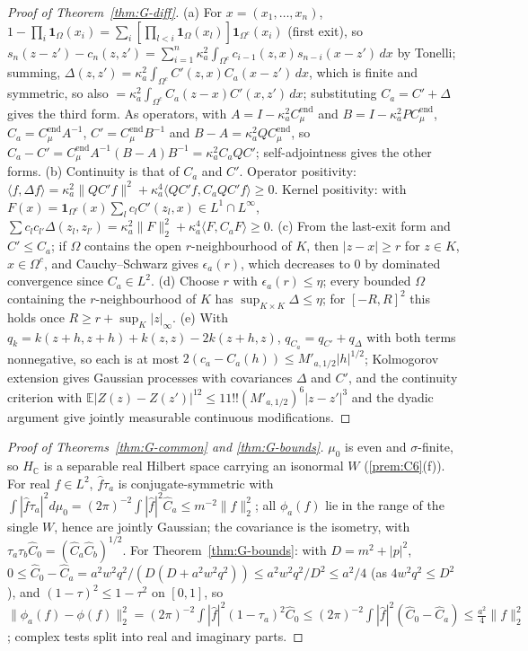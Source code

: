 \documentclass[11pt]{article}
\theoremstyle{plain}
\theoremstyle{definition}
\theoremstyle{remark}
\newcommand{\C}{\mathbb{C}}
\newcommand{\E}{\mathbb{E}}
\newcommand{\ind}{\mathbf{1}}
\newcommand{\Cend}{C^{\mathrm{end}}_{\mu}}
\begin{document}
\begin{proof}[Proof of Theorem~\ref{thm:G-diff}]
(a) For $x=(x_1,\dots,x_n)$, $1-\prod_i\ind_\Omega(x_i)=\sum_i[\prod_{l<i}\ind_\Omega(x_l)]\ind_{\Omega^{c}}(x_i)$ (first exit), so
$s_n(z-z')-c_n(z,z')=\sum_{i=1}^{n}\kappa_a^{2}\int_{\Omega^{c}}c_{i-1}(z,x)s_{n-i}(x-z')\,dx$ by Tonelli; summing,
$\Delta(z,z')=\kappa_a^{2}\int_{\Omega^{c}}C'(z,x)C_a(x-z')\,dx$, which is finite and symmetric, so also
$=\kappa_a^{2}\int_{\Omega^{c}}C_a(z-x)C'(x,z')\,dx$; substituting $C_a=C'+\Delta$ gives the third form. As
operators, with $A=I-\kappa_a^{2}\Cend$ and $B=I-\kappa_a^{2}P\Cend$, $C_a=\Cend A^{-1}$, $C'=\Cend B^{-1}$ and
$B-A=\kappa_a^{2}Q\Cend$, so $C_a-C'=\Cend A^{-1}(B-A)B^{-1}=\kappa_a^{2}C_aQC'$; self-adjointness gives the other
forms. (b) Continuity is that of $C_a$ and $C'$. Operator positivity:
$\langle f,\Delta f\rangle=\kappa_a^{2}\|QC'f\|^{2}+\kappa_a^{4}\langle QC'f,C_aQC'f\rangle\ge0$. Kernel positivity: with
$F(x)=\ind_{\Omega^{c}}(x)\sum_lc_lC'(z_l,x)\in L^{1}\cap L^{\infty}$,
$\sum c_lc_{l'}\Delta(z_l,z_{l'})=\kappa_a^{2}\|F\|_2^{2}+\kappa_a^{4}\langle F,C_aF\rangle\ge0$. (c) From the last-exit form and
$C'\le C_a$; if $\Omega$ contains the open $r$-neighbourhood of $K$, then $|z-x|\ge r$ for $z\in K$,
$x\in\Omega^{c}$, and Cauchy--Schwarz gives $\epsilon_a(r)$, which decreases to $0$ by dominated
convergence since $C_a\in L^{2}$. (d) Choose $r$ with $\epsilon_a(r)\le\eta$; every bounded $\Omega$
containing the $r$-neighbourhood of $K$ has $\sup_{K\times K}\Delta\le\eta$; for $[-R,R]^{2}$ this holds once
$R\ge r+\sup_K|z|_\infty$. (e) With $q_k=k(z+h,z+h)+k(z,z)-2k(z+h,z)$, $q_{C_a}=q_{C'}+q_\Delta$ with both
terms nonnegative, so each is at most $2(c_a-C_a(h))\le M'_{a,1/2}|h|^{1/2}$; Kolmogorov
extension gives Gaussian processes with covariances $\Delta$ and $C'$, and the continuity
criterion with $\E|Z(z)-Z(z')|^{12}\le11!!(M'_{a,1/2})^{6}|z-z'|^{3}$ and the dyadic argument give
jointly measurable continuous modifications.
\end{proof}

\begin{proof}[Proof of Theorems~\ref{thm:G-common} and \ref{thm:G-bounds}]
$\mu_0$ is even and $\sigma$-finite, so $H_\C$ is a separable real Hilbert space carrying an
isonormal $W$ (\ref{prem:C6}(f)). For real $f\in L^{2}$, $\hat f\tau_a$ is conjugate-symmetric with
$\int|\hat f\tau_a|^{2}d\mu_0=(2\pi)^{-2}\int|\hat f|^{2}\hat C_a\le m^{-2}\|f\|_2^{2}$; all $\phi_a(f)$ lie in the range of
the single $W$, hence are jointly Gaussian; the covariance is the isometry, with
$\tau_a\tau_b\hat C_0=(\hat C_a\hat C_b)^{1/2}$. For Theorem~\ref{thm:G-bounds}: with $D=m^{2}+|p|^{2}$,
$0\le\hat C_0-\hat C_a=a^{2}w^{2}q^{2}/(D(D+a^{2}w^{2}q^{2}))\le a^{2}w^{2}q^{2}/D^{2}\le a^{2}/4$ (as $4w^{2}q^{2}\le D^{2}$), and
$(1-\tau)^{2}\le1-\tau^{2}$ on $[0,1]$, so
$\|\phi_a(f)-\phi(f)\|_2^{2}=(2\pi)^{-2}\int|\hat f|^{2}(1-\tau_a)^{2}\hat C_0\le(2\pi)^{-2}\int|\hat f|^{2}(\hat C_0-\hat C_a)\le\tfrac{a^{2}}4\|f\|_2^{2}$; complex
tests split into real and imaginary parts.
\end{proof}
\end{document}
